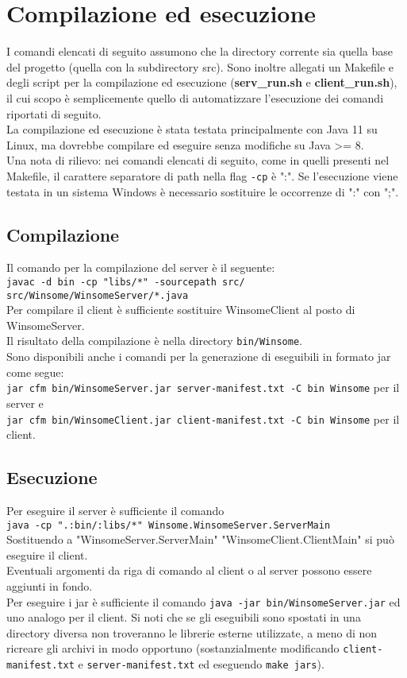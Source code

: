 \section{Compilazione ed esecuzione}
I comandi elencati di seguito assumono che la directory corrente sia quella base del progetto
(quella con la subdirectory src). Sono inoltre allegati un Makefile e degli script per la compilazione ed esecuzione (\textbf{serv\_run.sh} e \textbf{client\_run.sh}), il cui scopo è semplicemente quello di automatizzare l'esecuzione dei comandi riportati di seguito.\\
La compilazione ed esecuzione è stata testata principalmente con Java 11 su Linux, ma dovrebbe compilare ed eseguire senza modifiche su Java >= 8.\\
Una nota di rilievo: nei comandi elencati di seguito, come in quelli presenti nel Makefile, il carattere separatore di path nella flag \verb|-cp| è ":". Se l'esecuzione viene testata in un sistema Windows è necessario sostituire le occorrenze di ":" con ";".

\subsection{Compilazione}
Il comando per la compilazione del server è il seguente:\\
\verb|javac -d bin -cp "libs/*" -sourcepath src/ src/Winsome/WinsomeServer/*.java|\\
Per compilare il client è sufficiente sostituire WinsomeClient al posto di WinsomeServer.\\
Il risultato della compilazione è nella directory \verb|bin/Winsome|.\\

Sono disponibili anche i comandi per la generazione di eseguibili in formato jar come segue:\\
\verb|jar cfm bin/WinsomeServer.jar server-manifest.txt -C bin Winsome| per il server e\\
\verb|jar cfm bin/WinsomeClient.jar client-manifest.txt -C bin Winsome| per il client.

\subsection{Esecuzione}
Per eseguire il server è sufficiente il comando\\
\verb|java -cp ".:bin/:libs/*" Winsome.WinsomeServer.ServerMain|\\
Sostituendo a "WinsomeServer.ServerMain" "WinsomeClient.ClientMain" si può eseguire il client.\\
Eventuali argomenti da riga di comando al client o al server possono essere aggiunti in fondo.\\
Per eseguire i jar è sufficiente il comando \verb|java -jar bin/WinsomeServer.jar| ed uno analogo per il client.
Si noti che se gli eseguibili sono spostati in una directory diversa non troveranno le librerie esterne utilizzate,
a meno di non ricreare gli archivi in modo opportuno (sostanzialmente modificando \verb|client-manifest.txt| e
 \verb|server-manifest.txt| ed eseguendo \verb|make jars|).


